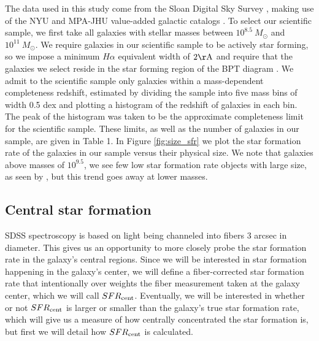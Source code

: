\documentclass[iop]{emulateapj}
\begin{document}
The data used in this study come from the Sloan Digital Sky Survey \citep[SDSS,][]{SDSS}, making use of the NYU and MPA-JHU value-added galactic catalogs \citep{Kauffmann03,Brinchmann04,blanton05vagc}. To select our scientific sample, we first take all galaxies with stellar masses between $10^{8.5}\ M_{\odot}$ and $10^{11}\ M_{\odot}$. We require galaxies in our scientific sample to be actively star forming, so we impose a minimum $H\alpha$ equivalent width of $2 \rm \AA$ and require that the galaxies we select reside in the star forming region of the BPT diagram \citep{BPT}. We admit to the scientific sample only galaxies within a mass-dependent completeness redshift, estimated by dividing the sample into five mass bins of width 0.5 dex and plotting a histogram of the redshift of galaxies in each bin. The peak of the histogram was taken to be the approximate completeness limit for the scientific sample. These limits, as well as the number of galaxies in our sample, are given in Table 1. In Figure \ref{fig:size_sfr} we plot the star formation rate of the galaxies in our sample versus their physical size. We note that galaxies above masses of $10^{9.5}$, we see few low star formation rate objects with large size, as seen by \citet{Patel18}, but this trend goes away at lower masses.


\subsection{Central star formation}
\label{sec:fibercor}
SDSS spectroscopy is based on light being channeled into fibers $3$ arcsec in diameter. This gives us an opportunity to more closely probe the star formation rate in the galaxy's central regions. Since we will be interested in star formation happening in the galaxy's center, we will define a fiber-corrected star formation rate that intentionally over weights the fiber measurement taken at the galaxy center, which we will call $SFR_{\rm cent}$. Eventually, we will be interested in whether or not $SFR_{\rm cent}$ is larger or smaller than the galaxy's true star formation rate, which will give us a measure of how centrally concentrated the star formation is, but first we will detail how $SFR_{\rm cent}$ is calculated.
\end{document}
